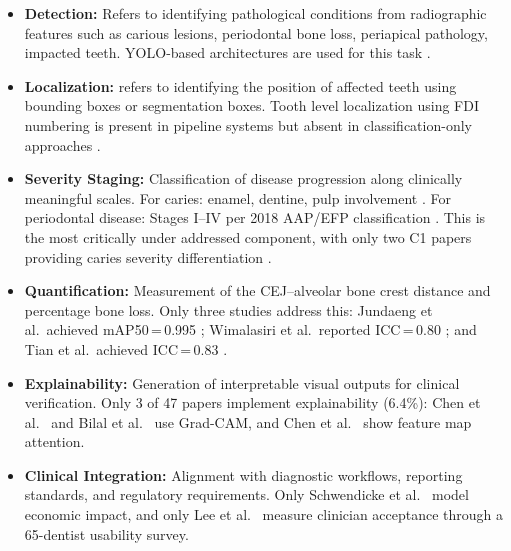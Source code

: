 \documentclass[conference]{IEEEtran}
\begin{document}
\begin{itemize}
    \item \textbf{Detection:} Refers to identifying pathological conditions from radiographic features such as carious lesions, periodontal bone loss, periapical pathology, impacted teeth. YOLO-based architectures are used for this task 
          \cite{ayhan2025detection,nassiri2025yolo,chen2024cariesxrays,
          bizjak2024advancing,pornprasertsuk2025clinical}.

    \item \textbf{Localization:}  refers to identifying the position of affected teeth using bounding boxes or segmentation boxes. Tooth level localization using FDI numbering is present in pipeline systems
          \cite{jundaeng2025advanced,chen2024cariesxrays,bizjak2024advancing,
          pornprasertsuk2025clinical} but absent in
          classification-only approaches
          \cite{kaushik2025densenet201,mathur2025comparative,ozdemir2026enhanced}.

    \item \textbf{Severity Staging:} Classification of disease
          progression along clinically meaningful scales. For caries:
          enamel, dentine, pulp involvement
          \cite{asadi2024detection,bizjak2024advancing}. For
          periodontal disease: Stages I--IV per 2018 AAP/EFP
          classification \cite{chmielewski20252018}. This is the most
          critically under addressed component, with only two C1 papers
          providing caries severity differentiation
          \cite{bizjak2024advancing,asadi2024detection}.

    \item \textbf{Quantification:} Measurement of the CEJ--alveolar
          bone crest distance and percentage bone loss. Only three
          studies address this: Jundaeng et al.\ achieved
          mAP50\,=\,0.995 \cite{jundaeng2025advanced}; Wimalasiri et
          al.\ reported ICC\,=\,0.80 \cite{wimalasiri2025ai}; and Tian
          et al.\ achieved ICC\,=\,0.83 \cite{tian2025development}.

    \item \textbf{Explainability:} Generation of interpretable visual
          outputs for clinical verification. Only 3 of 47 papers
          implement explainability (6.4\%): Chen et al.\
          \cite{chen2023deep} and Bilal et al.\ \cite{bilal2024pdcnet}
          use Grad-CAM, and Chen et al.\ \cite{chen2024cariesxrays}
          show feature map attention.

    \item \textbf{Clinical Integration:} Alignment with diagnostic
          workflows, reporting standards, and regulatory requirements.
          Only Schwendicke et al.\ \cite{schwendicke2021cost} model
          economic impact, and only Lee et al.\ \cite{lee2025evaluation}
          measure clinician acceptance through a 65-dentist usability
          survey.
\end{itemize}
\end{document}
